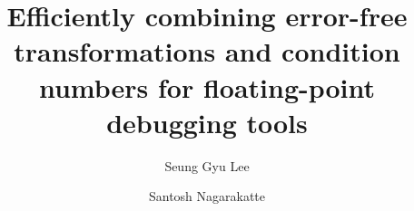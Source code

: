 \documentclass[sigconf]{acmart}
\title{Efficiently combining error-free transformations and condition numbers for floating-point debugging tools}
\author{Seung Gyu Lee}
\affiliation{
  \institution{Rutgers University}
  \country{United States}
}
\author{Santosh Nagarakatte}
\affiliation{
  \institution{Rutgers University}
  \country{United States}
}
\begin{document}
\begin{abstract}

\end{abstract}

\maketitle















\end{document}
